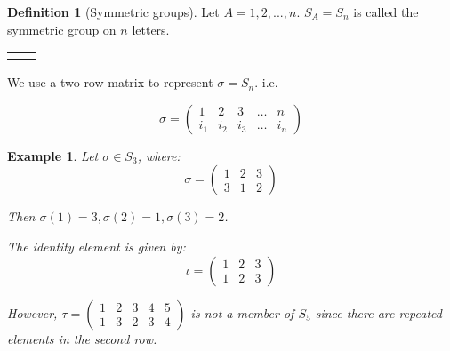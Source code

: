 \documentclass{article}
\theoremstyle{MyNonumberplain}
\theoremstyle{break}
\newcommand{\nline}{\begin{tabular}{ll}&\\\end{tabular}}
\theoremstyle{break}
\newtheorem{example}{Example}[section]
\theoremstyle{break}
\theoremstyle{definition}
\theoremstyle{break}
\newtheorem{definition}{Definition}[section]
\begin{document}
\begin{defbox}
    \begin{definition}[Symmetric groups]
        Let $A={1,2,...,n}$. $S_A=S_n$ is called the symmetric group on $n$ letters.

        \nline

        We use a two-row matrix to represent $\sigma = S_n$. i.e. 

        \[ \sigma = \left(\begin{array}{ccccc}
            1 & 2 & 3 & \ldots & n\\
            i_1 & i_2 & i_3 & \ldots & i_n
          \end{array}\right) \]
    \end{definition}
\end{defbox}

\begin{expbox}
    \begin{example}
        Let $\sigma\in S_3$, where:
        \[ \sigma = \left(\begin{array}{ccc}
            1 & 2 & 3\\
            3 & 1 & 2
          \end{array}\right) \]

          Then $\sigma(1)=3,\sigma(2)=1,\sigma(3)=2$.\bigskip

          The identity element is given by:
          \[ \iota = \left(\begin{array}{ccc}
            1 & 2 & 3\\
            1 & 2 & 3
          \end{array}\right) \]

          However, $\tau = \left(\begin{array}{ccccc}
            1 & 2 & 3 & 4 & 5\\
            1 & 3 & 2 & 3 & 4
          \end{array}\right)$ is not a member of $S_5$ since there are repeated elements in the second row.
    \end{example}
\end{expbox}
\end{document}
